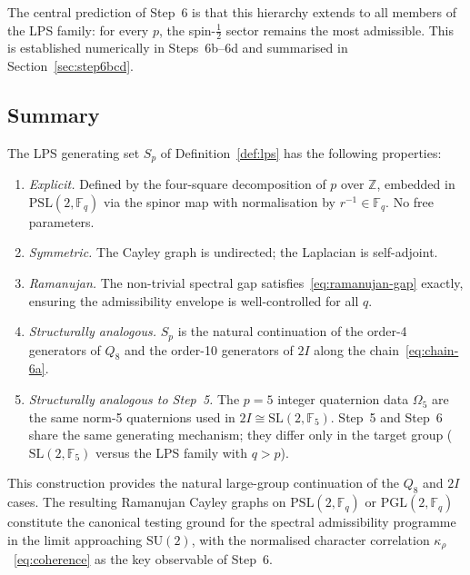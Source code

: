     The central prediction of Step~6 is that this hierarchy extends to all
    members of the LPS family: for every $p$, the spin-$\tfrac{1}{2}$ sector
    remains the most admissible.
    This is established numerically in Steps~6b--6d and summarised in
    Section~\ref{sec:step6bcd}.

  \subsection{Summary}
    \label{sec:step6a-summary}

    The LPS generating set $S_p$ of Definition~\ref{def:lps} has the
    following properties:
    \begin{enumerate}
      \item \emph{Explicit.} Defined by the four-square decomposition of $p$
      over $\mathbb{Z}$, embedded in $\mathrm{PSL}(2,\mathbb{F}_q)$ via the
      spinor map with normalisation by $r^{-1} \in \mathbb{F}_q$.
      No free parameters.
      \item \emph{Symmetric.} The Cayley graph is undirected; the Laplacian
      is self-adjoint.
      \item \emph{Ramanujan.} The non-trivial spectral gap
      satisfies~\eqref{eq:ramanujan-gap} exactly, ensuring the
      admissibility envelope is well-controlled for all $q$.
      \item \emph{Structurally analogous.} $S_p$ is the natural continuation
      of the order-4 generators of $Q_8$ and the order-10 generators of
      $2I$ along the chain~\eqref{eq:chain-6a}.
      \item \emph{Structurally analogous to Step~5.}
      The $p = 5$ integer quaternion data $\Omega_5$ are the same norm-5
      quaternions used in $2I \cong \mathrm{SL}(2,\mathbb{F}_5)$.
      Step~5 and Step~6 share the same generating mechanism; they differ
      only in the target group ($\mathrm{SL}(2,\mathbb{F}_5)$ versus the
      LPS family with $q > p$).
    \end{enumerate}
    This construction provides the natural large-group continuation of the
    $Q_8$ and $2I$ cases.
    The resulting Ramanujan Cayley graphs on $\mathrm{PSL}(2,\mathbb{F}_q)$
    or $\mathrm{PGL}(2,\mathbb{F}_q)$ constitute the canonical testing ground
    for the spectral admissibility programme in the limit approaching
    $\mathrm{SU}(2)$, with the normalised character correlation
    $\kappa_\rho$~\eqref{eq:coherence} as the key observable of Step~6.
